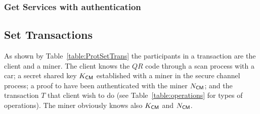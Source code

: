 

\subsubsection{Get Services with authentication}
\label{ssec:getServAuth}





\subsection{Set Transactions} 
\label{ssec:setTrans}

As shown by Table~\ref{table:ProtSetTrans} the participants in a transaction 
are the client and a miner.
The client knows the $QR$ code through a scan process with
a car; a secret shared key $K_{\textsf{C}\textsf{M}}$ established with
a miner in the secure channel process; a proof to have been authenticated
with the miner $N_{\textsf{C}\textsf{M}}$; and the transaction $T$ that client wish 
to do  (see Table~\ref{table:operations} for types of operations). 
The miner obviously knows also $K_{\textsf{C}\textsf{M}}$ and $N_{\textsf{C}\textsf{M}}$. 
